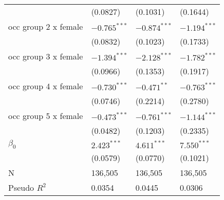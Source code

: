 \begin{tabular}{llll}
                                       &           (0.0827) &           (0.1031) &           (0.1644) \\
occ group 2 x female                   &     $-0.765^{***}$ &     $-0.874^{***}$ &     $-1.194^{***}$ \\
                                       &           (0.0832) &           (0.1023) &           (0.1733) \\
occ group 3 x female                   &     $-1.394^{***}$ &     $-2.128^{***}$ &     $-1.782^{***}$ \\
                                       &           (0.0966) &           (0.1353) &           (0.1917) \\
occ group 4 x female                   &     $-0.730^{***}$ &      $-0.471^{**}$ &     $-0.763^{***}$ \\
                                       &           (0.0746) &           (0.2214) &           (0.2780) \\
occ group 5 x female                   &     $-0.473^{***}$ &     $-0.761^{***}$ &     $-1.144^{***}$ \\
                                       &           (0.0482) &           (0.1203) &           (0.2335) \\
$\beta_0$                              &      $2.423^{***}$ &      $4.611^{***}$ &      $7.550^{***}$ \\
                                       &           (0.0579) &           (0.0770) &           (0.1021) \\
\midrule
N                                      &            136,505 &            136,505 &            136,505 \\
Pseudo $R^2$                           &             0.0354 &             0.0445 &             0.0306 \\
\bottomrule
\end{tabular}
